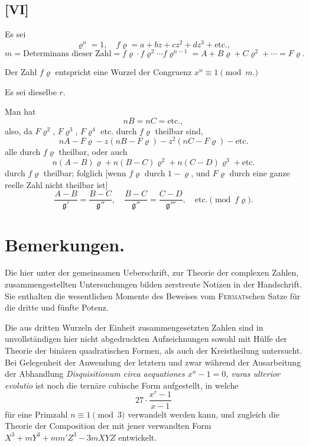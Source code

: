 \documentclass[10pt,a4paper]{article}
\begin{document}
\newpage
\setcounter{page}{397}

\subsection*{[VI]}
\label{sec:VI}

Es sei
\[
\varrho^n = 1, \quad f\varrho = a + bz + cz^2 + dz^3 + \text{etc.},
\]
\[
m = \text{Determinans dieser Zahl} = f\varrho \cdot f\varrho^2 \cdots f\varrho^{n-1} = A + B\varrho + C\varrho^2 + \cdots = F\varrho.
\]

Der Zahl $f\varrho$ entspricht eine Wurzel der Congruenz $x^n \equiv 1 \pmod{m.}$

Es sei dieselbe $r$.

Man hat
\[
nB = nC = \text{etc.},
\]
also, da $F\varrho^2$, $F\varrho^3$, $F\varrho^4$ etc. durch $f\varrho$ theilbar sind,
\[
nA - F\varrho - z(nB - F\varrho) - z^2(nC - F\varrho) - \text{etc.}
\]
alle durch $f\varrho$ theilbar, oder auch
\[
n(A - B)\varrho + n(B - C)\varrho^2 + n(C - D)\varrho^3 + \text{etc.}
\]
durch $f\varrho$ theilbar; folglich [wenn $f\varrho$ durch $1 - \varrho$, und $F\varrho$ durch eine ganze reelle Zahl nicht theilbar ist]
\[
\frac{A - B}{\mathfrak{g}'} = \frac{B - C}{\mathfrak{g}''}, \quad \frac{B - C}{\mathfrak{g}''} = \frac{C - D}{\mathfrak{g}'''}, \quad \text{etc.} \pmod{f\varrho}.
\]

\newpage
\setcounter{page}{398}

\section*{Bemerkungen.}

Die hier unter der gemeinsamen Ueberschrift, zur Theorie der complexen Zahlen, zusammengestellten Untersuchungen bilden zerstreute Notizen in der Handschrift. Sie enthalten die wesentlichen Momente des Beweises vom \textsc{Fermat}schen Satze für die dritte und fünfte Potenz.

Die aus dritten Wurzeln der Einheit zusammengesetzten Zahlen sind in unvollständigen hier nicht abgedruckten Aufzeichnungen sowohl mit Hülfe der Theorie der binären quadratischen Formen, als auch der Kreistheilung untersucht. Bei Gelegenheit der Anwendung der letztern und zwar während der Ausarbeitung der Abhandlung \textit{Disquisitionum circa aequationes $x^n - 1 = 0$, vuras ulterior evolutio} ist noch die ternäre cubische Form aufgestellt, in welche
\[
27 \cdot \frac{x^r - 1}{x - 1}
\]
für eine Primzahl $n \equiv 1 \pmod 3$ verwandelt werden kann, und zugleich die Theorie der Composition der mit jener verwandten Form $X^3 + mY^3 + mm'Z^3 - 3mXYZ$ entwickelt.
\end{document}
